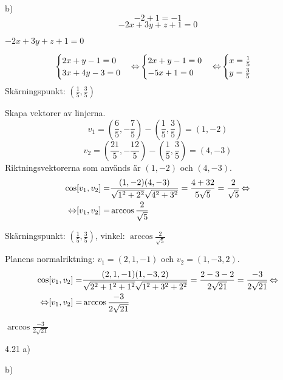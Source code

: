 \begin{task}{b)}
	\[-2+1=-1\]
	\[-2x+3y+z+1=0\]

	\ans $-2x+3y+z+1=0$
\end{task}

\pagebreak
\begin{task}{4.19}
	\[\begin{cases}
		2x+y-1=0 \\
		3x+4y-3=0
	\end{cases} \operatorname{\Leftrightarrow}
	\begin{cases}
		2x+y-1=0 \\
		-5x+1=0
	\end{cases} \operatorname{\Leftrightarrow}
	\begin{cases}
		x=\frac{1}{5} \\
		y=\frac{3}{5}
	\end{cases}\]
	Skärningspunkt: $(\frac{1}{5}, \frac{3}{5})$

	Skapa vektorer av linjerna.
	\[v_1=(\frac{6}{5},-\frac{7}{5})-(\frac{1}{5}, \frac{3}{5})=(1,-2)\]
	\[v_2=(\frac{21}{5}, -\frac{12}{5})-(\frac{1}{5}, \frac{3}{5})=(4,-3)\]
	Riktningsvektorerna som används är $(1,-2)$ och $(4,-3)$.
	\begin{align*}
		\cos[v_1,v_2]=&
		\frac{(1,-2)\*(4,-3)}{\sqrt{1^2+2^2}\sqrt{4^2+3^2}}=
		\frac{4+3\*2}{5\sqrt{5}}=
		\frac{2}{\sqrt{5}} \lra \\ \lra
		[v_1,v_2]=&\arccos\frac{2}{\sqrt{5}}
	\end{align*}

	\ans Skärningspunkt: $(\frac{1}{5}, \frac{3}{5})$, vinkel: $\arccos\frac{2}{\sqrt{5}}$
\end{task}

\begin{task}{4.20}
	Planens normalriktning: $v_1=(2,1,-1)$ och $v_2=(1,-3,2)$.
	\begin{align*}
		\cos[v_1,v_2]=&
		\frac{(2,1,-1)\*(1,-3,2)}{\sqrt{2^2+1^2+1^2}\sqrt{1^2+3^2+2^2}}=
		\frac{2-3-2}{2\sqrt{21}}=
		\frac{-3}{2\sqrt{21}} \lra \\ \lra
		[v_1,v_2]=&\arccos\frac{-3}{2\sqrt{21}}
	\end{align*}

	\ans $\arccos\frac{-3}{2\sqrt{21}}$
\end{task}

\begin{task}{4.21 a)}
	\ans
\end{task}

\begin{task}{b)}
	\ans
\end{task}

